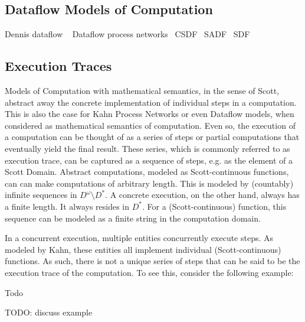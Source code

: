 \subsection{Dataflow Models of Computation}
Dennis dataflow ~\cite{dennis1974first,dennis1986data}
\cite{Parks:M95/105}
Dataflow process networks~\cite{lee1995dataflow,lee_matsikoudis_semantics}
\ac{CSDF}~\cite{bilsen1996cycle}
\ac{SADF}~\cite{theelen2006scenario}
\ac{SDF}~\cite{lee1987sdf}
\Blindtext[10]

\subsection{Execution Traces}
Models of Computation with mathematical semantics, in the sense of Scott, abstract away the concrete implementation of individual steps in a computation.
This is also the case for Kahn Process Networks or even Dataflow models, when considered as mathematical semantics of computation. 
Even so, the execution of a computation can be thought of as a series of steps or partial computations that eventually yield the final result.
These series, which is commonly referred to as execution trace, can be captured as a sequence of steps, e.g. as the element of a Scott Domain. 
Abstract computations, modeled as Scott-continuous functions, can can make computations of arbitrary length.
This is modeled by (countably) infinite sequences in $D^\omega \setminus D^*$.
A concrete execution, on the other hand, always has a finite length.
It always resides in $D^*$.
For a (Scott-continuous) function, this sequence can be modeled as a finite string in the computation domain.

In a concurrent execution, multiple entities concurrently execute steps.
As modeled by Kahn, these entities all implement individual (Scott-continuous) functions.
As such, there is not a unique series of steps that can be said to be the execution trace of the computation.
To see this, consider the following example:
\begin{ex}
  Todo
\end{ex}

TODO: discuss example

